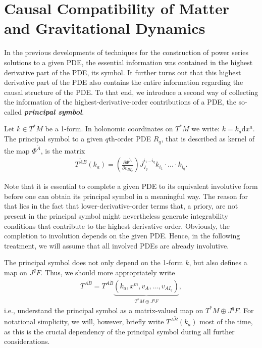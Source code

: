 \section{Causal Compatibility of Matter and Gravitational Dynamics}
In the previous developments of techniques for the construction of power series solutions to a given PDE, the essential information was contained in the highest derivative part of the PDE, its symbol. 
It further turns out that this highest derivative part of the PDE also contains the entire information regarding the causal structure of the PDE. To that end, we introduce a second way of collecting the information of the highest-derivative-order contributions of a PDE, the so-called \textbf{\textit{principal symbol}}.
\begin{definition} \label{PSym}
Let $ k \in T^{\ast}M$ be a  1-form. In holonomic coordinates on $T^{\ast}M$ we write: $k = k_{a} \mathrm{d}x^a$. The principal symbol to a given $q$th-order PDE $R_q$, that is described as kernel of the map $\Phi^{\tilde{A}}$, is the matrix
\begin{align}
    T^{\tilde{A} B}(k_a) = \left ( \frac{\partial \Phi^{\tilde{A}}}{\partial v_{BI_q}} \right ) J_{I_q}^{i_1...i_q} k_{i_1} \cdot ... \cdot k_{i_q}.
\end{align}
\end{definition}
\begin{remark}
Note that it is essential to complete a given PDE to its equivalent involutive form before one can obtain its principal symbol in a meaningful way. The reason for that lies in the fact that lower-derivative-order terms that, a priory, are not present in the principal symbol might nevertheless generate integrability conditions that contribute to the highest derivative order. Obviously, the completion to involution depends on the given PDE. Hence, in the following treatment, we will assume that all involved PDEs are already involutive.
\end{remark}
The principal symbol does not only depend on the 1-form $k$, but also defines a map on $J^qF$. Thus, we should more appropriately write
\begin{align}
    T^{A\tilde{B}} = T^{A\tilde{B}}\underbrace{(k_a,x^m,v_A,...,v_{AI_q})}_{T^{\ast}M \oplus J^qF},
\end{align}
i.e., understand the principal symbol as a matrix-valued map on $T^{\ast}M \oplus J^qF$. 
For notational simplicity, we will, however, briefly write $T^{A\tilde{B}}(k_a)$ most of the time, as this is the crucial dependency of the principal symbol during all further considerations.

